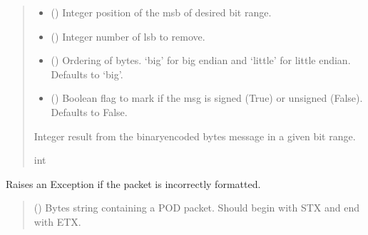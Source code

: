 \documentclass[letterpaper,10pt,english]{sphinxmanual}
\begin{document}
\begin{fulllineitems}
\begin{fulllineitems}
\begin{quote}
\begin{description}
\begin{itemize}
\item {} 
\sphinxAtStartPar
{} () \textendash{} Integer position of the msb of desired bit range.

\item {} 
\sphinxAtStartPar
{} () \textendash{} Integer number of lsb to remove.

\item {} 
\sphinxAtStartPar
{} (\sphinxstyleliteralemphasis{\sphinxupquote{, }}) \textendash{} Ordering of bytes. ‘big’ for big endian and ‘little’ for little                 endian. Defaults to ‘big’.

\item {} 
\sphinxAtStartPar
{} (\sphinxstyleliteralemphasis{\sphinxupquote{, }}) \textendash{} Boolean flag to mark if the msg is signed (True) or unsigned (False).                 Defaults to False.

\end{itemize}

\sphinxAtStartPar
Integer result from the binary\sphinxhyphen{}encoded bytes message in a given bit range.

\sphinxAtStartPar
int

\end{description}\end{quote}

\end{fulllineitems}


\begin{fulllineitems}
\label{\detokenize{PodApi.Packets:PodApi.Packets.Packet.Packet.CheckIfPacketIsValid}}
\pysigstartsignatures
{}
\pysigstopsignatures
\sphinxAtStartPar
Raises an Exception if the packet is incorrectly formatted.
\begin{quote}\begin{description}
\sphinxAtStartPar
{} () \textendash{} Bytes string containing a POD packet. Should begin with STX                 and end with ETX.


\end{description}
\end{quote}
\end{fulllineitems}
\end{fulllineitems}
\end{document}
